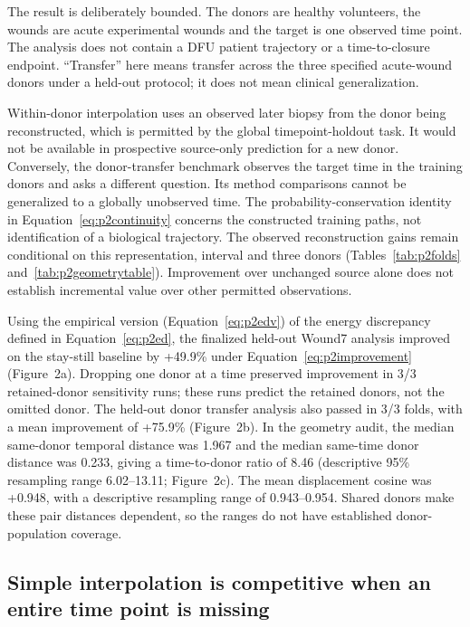 \documentclass[10pt,a4paper]{article}
\begin{document}
The result is deliberately bounded. The donors are healthy volunteers, the wounds are acute experimental wounds and the target is one observed time point. The analysis does not contain a DFU patient trajectory or a time-to-closure endpoint. ``Transfer'' here means transfer across the three specified acute-wound donors under a held-out protocol; it does not mean clinical generalization.

Within-donor interpolation uses an observed later biopsy from the donor being reconstructed, which is permitted by the global timepoint-holdout task. It would not be available in prospective source-only prediction for a new donor. Conversely, the donor-transfer benchmark observes the target time in the training donors and asks a different question. Its method comparisons cannot be generalized to a globally unobserved time. The probability-conservation identity in Equation~\eqref{eq:p2continuity} concerns the constructed training paths, not identification of a biological trajectory. The observed reconstruction gains remain conditional on this representation, interval and three donors (Tables~\ref{tab:p2folds} and~\ref{tab:p2geometrytable}). Improvement over unchanged source alone does not establish incremental value over other permitted observations.

\FloatBarrier
Using the empirical version (Equation~\eqref{eq:p2edv}) of the energy discrepancy defined in Equation~\eqref{eq:p2ed}, the finalized held-out Wound7 analysis improved on the stay-still baseline by +49.9\% under Equation~\eqref{eq:p2improvement} (Figure~2a\label{call:p2f2}). Dropping one donor at a time preserved improvement in 3/3 retained-donor sensitivity runs; these runs predict the retained donors, not the omitted donor. The held-out donor transfer analysis also passed in 3/3 folds, with a mean improvement of +75.9\% (Figure~2b). In the geometry audit, the median same-donor temporal distance was 1.967 and the median same-time donor distance was 0.233, giving a time-to-donor ratio of 8.46 (descriptive 95\% resampling range 6.02--13.11; Figure~2c). The mean displacement cosine was +0.948, with a descriptive resampling range of 0.943--0.954. Shared donors make these pair distances dependent, so the ranges do not have established donor-population coverage.




\subsection{Simple interpolation is competitive when an entire time point is missing}
\end{document}
